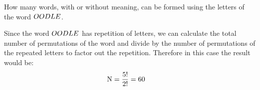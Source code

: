 
%
%
%
%      
% 
% 
%   



\question[2] How many words, with or without meaning, can be formed
using the letters of the word $OODLE$.



\watchout

\ifprintanswers
\fi 

\begin{solution}[mcq]
  Since the word $OODLE$ has repetition of letters, we can calculate the
  total number of permutations of the word and divide by the number of
  permutations of the repeated letters to factor out the repetition.
  Therefore in this case the result would be:
  \begin{align}
  	\text{N} &= \dfrac{5!}{2!} = 60
  \end{align}

\end{solution}
